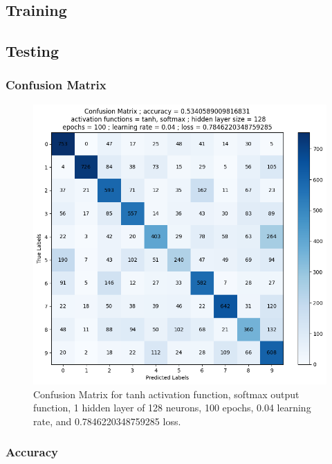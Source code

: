 \documentclass{article}
\begin{document}
\subsection{Training}
\subsection{Testing}
\subsubsection{Confusion Matrix}
\begin{figure}
    \centering
    \includegraphics[width=\textwidth]{media/confusion/confusion_matrix_activation_functions_tanh_softmax_hidden_layer_size_128_epochs_100_learning_rate_0.04_loss_0.7846220348759285.png}
    \caption{Confusion Matrix for tanh activation function, softmax output function, 1 hidden layer of 128 neurons, 100 epochs, 0.04 learning rate, and 0.7846220348759285 loss.}
    \label{fig:confusion}
\end{figure}
\subsubsection{Accuracy}
\end{document}
